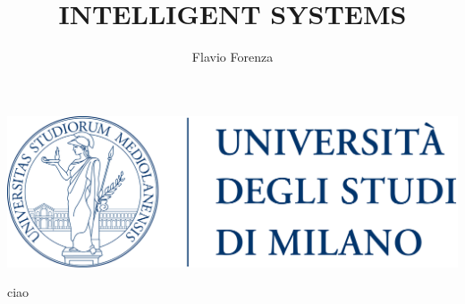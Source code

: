 \documentclass{beamer}
\title[short]{INTELLIGENT SYSTEMS}
\author{Flavio Forenza}\vspace{10pt}
\institute{mat. 938367}
\date{}
\begin{document}
\begin{frame}
    \maketitle
    \begin{center}
        \includegraphics[width = 0.4\linewidth ]{images/logoUnimi.png}   
    \end{center}
\end{frame}

\begin{frame}
    ciao  
\end{frame}




    
\end{document}
